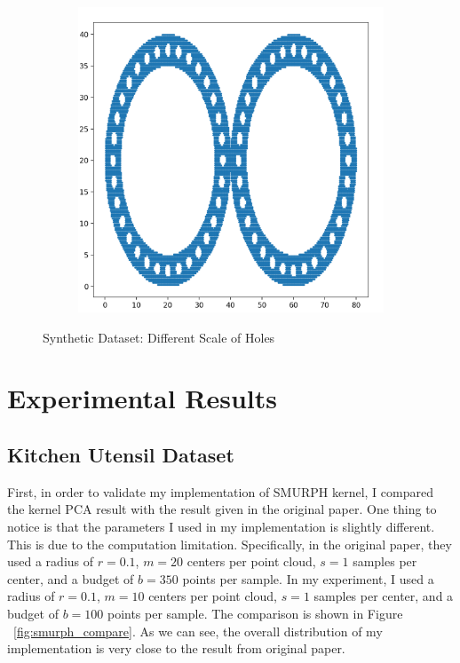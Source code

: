 \documentclass[10pt]{article}
\begin{document}
\begin{figure}[H]
\begin{subfigure}[h]{0.2\textwidth}
    \end{subfigure}%
    \begin{subfigure}[h]{0.2\textwidth}
        \includegraphics[width=\linewidth]{ms_4}
    \end{subfigure}%
    \caption{Synthetic Dataset: Different Scale of Holes}
    \label{fig:multiscale_dataset}
\end{figure}

\section{Experimental Results}

\subsection{Kitchen Utensil Dataset}

First, in order to validate my implementation of SMURPH kernel, I compared the kernel PCA result
with the result given in the original paper. 
One thing to notice is that the parameters I used in my implementation is slightly different.
This is due to the computation limitation.
Specifically, in the original paper, they used a radius of $r = 0.1$, $m = 20$ centers per point cloud, $s = 1$ samples per center, and a budget of $b = 350$ points per sample.
In my experiment, I used a radius of $r = 0.1$, $m = 10$ centers per point cloud, $s = 1$ samples per center, and a budget of $b = 100$ points per sample.
The comparison is shown in Figure ~\ref{fig:smurph_compare}.
As we can see, the overall distribution of my implementation is very close to the result from original paper.
\end{document}
